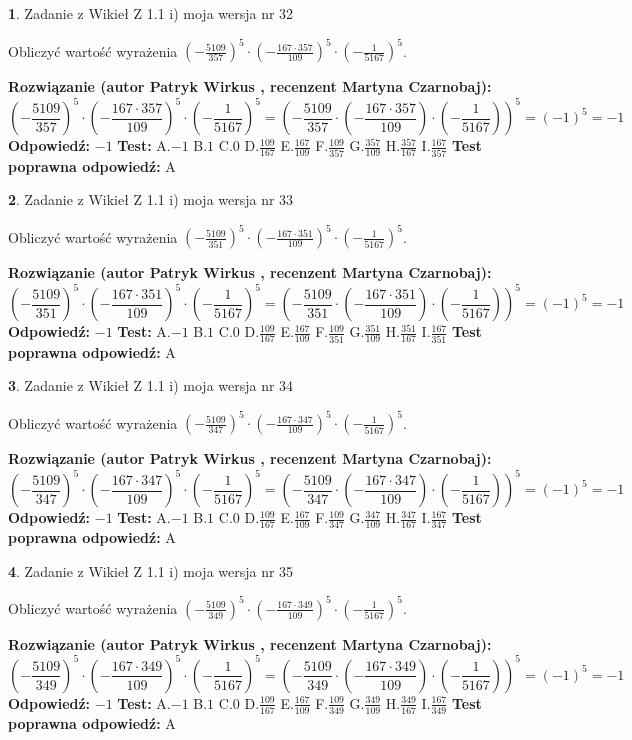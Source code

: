 \documentclass[12pt, a4paper]{article}
\theoremstyle{definition} %
\newtheorem{zad}{}
\newcommand{\zadStart}[1]{\begin{zad}#1\newline}
\newcommand{\zadStop}{\end{zad}}
\newcommand{\rozwStart}[2]{\noindent \textbf{Rozwiązanie (autor #1 , recenzent #2): }\newline}
\newcommand{\rozwStop}{\newline}
\newcommand{\odpStart}{\noindent \textbf{Odpowiedź:}\newline}
\newcommand{\odpStop}{\newline}
\newcommand{\testStart}{\noindent \textbf{Test:}\newline}
\newcommand{\testStop}{\newline}
\newcommand{\kluczStart}{\noindent \textbf{Test poprawna odpowiedź:}\newline}
\newcommand{\kluczStop}{\newline}
\begin{document}
\zadStart{Zadanie z Wikieł Z 1.1 i) moja wersja nr 32}

Obliczyć wartość wyrażenia $(-\frac{5109}{357})^{5} \cdot (-\frac{167 \cdot 357}{109})^{5} \cdot (-\frac{1}{5167})^{5}$.
\zadStop
\rozwStart{Patryk Wirkus}{Martyna Czarnobaj}
$$(-\frac{5109}{357})^{5} \cdot (-\frac{167 \cdot 357}{109})^{5} \cdot (-\frac{1}{5167})^{5} = (-\frac{5109}{357} \cdot (-\frac{167 \cdot 357}{109}) \cdot (-\frac{1}{5167}))^{5} = (-1)^{5} = -1$$
\rozwStop
\odpStart
$-1$
\odpStop
\testStart
A.$-1$ B.$1$ C.$0$ D.$\frac{109}{167}$ E.$\frac{167}{109}$
F.$\frac{109}{357}$ G.$\frac{357}{109}$
H.$\frac{357}{167}$
I.$\frac{167}{357}$
\testStop
\kluczStart
A
\kluczStop



\zadStart{Zadanie z Wikieł Z 1.1 i) moja wersja nr 33}

Obliczyć wartość wyrażenia $(-\frac{5109}{351})^{5} \cdot (-\frac{167 \cdot 351}{109})^{5} \cdot (-\frac{1}{5167})^{5}$.
\zadStop
\rozwStart{Patryk Wirkus}{Martyna Czarnobaj}
$$(-\frac{5109}{351})^{5} \cdot (-\frac{167 \cdot 351}{109})^{5} \cdot (-\frac{1}{5167})^{5} = (-\frac{5109}{351} \cdot (-\frac{167 \cdot 351}{109}) \cdot (-\frac{1}{5167}))^{5} = (-1)^{5} = -1$$
\rozwStop
\odpStart
$-1$
\odpStop
\testStart
A.$-1$ B.$1$ C.$0$ D.$\frac{109}{167}$ E.$\frac{167}{109}$
F.$\frac{109}{351}$ G.$\frac{351}{109}$
H.$\frac{351}{167}$
I.$\frac{167}{351}$
\testStop
\kluczStart
A
\kluczStop



\zadStart{Zadanie z Wikieł Z 1.1 i) moja wersja nr 34}

Obliczyć wartość wyrażenia $(-\frac{5109}{347})^{5} \cdot (-\frac{167 \cdot 347}{109})^{5} \cdot (-\frac{1}{5167})^{5}$.
\zadStop
\rozwStart{Patryk Wirkus}{Martyna Czarnobaj}
$$(-\frac{5109}{347})^{5} \cdot (-\frac{167 \cdot 347}{109})^{5} \cdot (-\frac{1}{5167})^{5} = (-\frac{5109}{347} \cdot (-\frac{167 \cdot 347}{109}) \cdot (-\frac{1}{5167}))^{5} = (-1)^{5} = -1$$
\rozwStop
\odpStart
$-1$
\odpStop
\testStart
A.$-1$ B.$1$ C.$0$ D.$\frac{109}{167}$ E.$\frac{167}{109}$
F.$\frac{109}{347}$ G.$\frac{347}{109}$
H.$\frac{347}{167}$
I.$\frac{167}{347}$
\testStop
\kluczStart
A
\kluczStop



\zadStart{Zadanie z Wikieł Z 1.1 i) moja wersja nr 35}

Obliczyć wartość wyrażenia $(-\frac{5109}{349})^{5} \cdot (-\frac{167 \cdot 349}{109})^{5} \cdot (-\frac{1}{5167})^{5}$.
\zadStop
\rozwStart{Patryk Wirkus}{Martyna Czarnobaj}
$$(-\frac{5109}{349})^{5} \cdot (-\frac{167 \cdot 349}{109})^{5} \cdot (-\frac{1}{5167})^{5} = (-\frac{5109}{349} \cdot (-\frac{167 \cdot 349}{109}) \cdot (-\frac{1}{5167}))^{5} = (-1)^{5} = -1$$
\rozwStop
\odpStart
$-1$
\odpStop
\testStart
A.$-1$ B.$1$ C.$0$ D.$\frac{109}{167}$ E.$\frac{167}{109}$
F.$\frac{109}{349}$ G.$\frac{349}{109}$
H.$\frac{349}{167}$
I.$\frac{167}{349}$
\testStop
\kluczStart
A
\kluczStop
\end{document}
